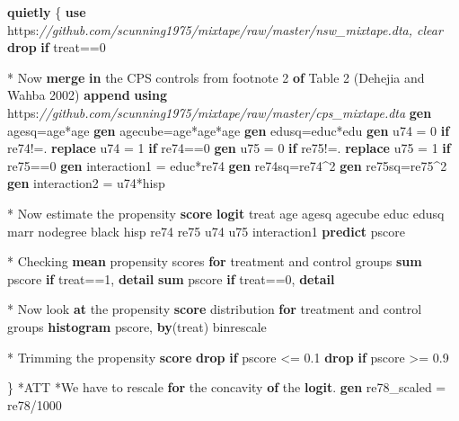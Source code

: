 \documentclass[
]{book}
\newenvironment{Shaded}{\begin{snugshade}}{\end{snugshade}}
\newcommand{\BaseNTok}[1]{\textcolor[rgb]{0.00,0.00,0.81}{#1}}
\newcommand{\CommentTok}[1]{\textcolor[rgb]{0.56,0.35,0.01}{\textit{#1}}}
\newcommand{\FunctionTok}[1]{\textcolor[rgb]{0.13,0.29,0.53}{\textbf{#1}}}
\newcommand{\KeywordTok}[1]{\textcolor[rgb]{0.13,0.29,0.53}{\textbf{#1}}}
\newcommand{\NormalTok}[1]{#1}
\begin{document}
\begin{Shaded}
\begin{Highlighting}[]
\KeywordTok{quietly}\NormalTok{ \{}
\KeywordTok{use}\NormalTok{ https:}\CommentTok{//github.com/scunning1975/mixtape/raw/master/nsw\_mixtape.dta, clear}
\KeywordTok{drop} \KeywordTok{if}\NormalTok{ treat==0}

\NormalTok{* Now }\KeywordTok{merge} \KeywordTok{in}\NormalTok{ the CPS controls from footnote 2 }\KeywordTok{of}\NormalTok{ Table 2 (Dehejia and Wahba 2002)}
\KeywordTok{append} \KeywordTok{using}\NormalTok{ https:}\CommentTok{//github.com/scunning1975/mixtape/raw/master/cps\_mixtape.dta}
\KeywordTok{gen}\NormalTok{ agesq=age*age}
\KeywordTok{gen}\NormalTok{ agecube=age*age*age}
\KeywordTok{gen}\NormalTok{ edusq=educ*edu}
\KeywordTok{gen}\NormalTok{ u74 = 0 }\KeywordTok{if}\NormalTok{ re74!=.}
\KeywordTok{replace}\NormalTok{ u74 = 1 }\KeywordTok{if}\NormalTok{ re74==0}
\KeywordTok{gen}\NormalTok{ u75 = 0 }\KeywordTok{if}\NormalTok{ re75!=.}
\KeywordTok{replace}\NormalTok{ u75 = 1 }\KeywordTok{if}\NormalTok{ re75==0}
\KeywordTok{gen}\NormalTok{ interaction1 = educ*re74}
\KeywordTok{gen}\NormalTok{ re74sq=re74\^{}2}
\KeywordTok{gen}\NormalTok{ re75sq=re75\^{}2}
\KeywordTok{gen}\NormalTok{ interaction2 = u74*hisp}


\NormalTok{* Now estimate the propensity }\KeywordTok{score}
\KeywordTok{logit}\NormalTok{ treat age agesq agecube educ edusq marr nodegree }\BaseNTok{black}\NormalTok{ hisp re74 re75 u74 u75 interaction1 }
\KeywordTok{predict}\NormalTok{ pscore}

\NormalTok{* Checking }\KeywordTok{mean}\NormalTok{ propensity scores }\KeywordTok{for}\NormalTok{ treatment and control groups}
\KeywordTok{sum}\NormalTok{ pscore }\KeywordTok{if}\NormalTok{ treat==1, }\KeywordTok{detail}
\KeywordTok{sum}\NormalTok{ pscore }\KeywordTok{if}\NormalTok{ treat==0, }\KeywordTok{detail}

\NormalTok{* Now look }\FunctionTok{at}\NormalTok{ the propensity }\KeywordTok{score}\NormalTok{ distribution }\KeywordTok{for}\NormalTok{ treatment and control groups}
\KeywordTok{histogram}\NormalTok{ pscore, }\KeywordTok{by}\NormalTok{(treat) binrescale}

\NormalTok{* Trimming the propensity }\KeywordTok{score}
\KeywordTok{drop} \KeywordTok{if}\NormalTok{ pscore \textless{}= 0.1 }
\KeywordTok{drop} \KeywordTok{if}\NormalTok{ pscore \textgreater{}= 0.9}

\NormalTok{\}}
\NormalTok{*ATT}
\NormalTok{*We have to rescale }\KeywordTok{for}\NormalTok{ the concavity }\KeywordTok{of}\NormalTok{ the }\KeywordTok{logit}\NormalTok{.}
\KeywordTok{gen}\NormalTok{ re78\_scaled = re78/1000}


\end{Highlighting}
\end{Shaded}
\end{document}
